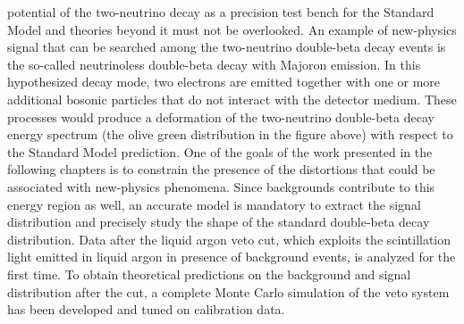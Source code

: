 potential of the two-neutrino decay as a precision test bench for the Standard Model and
theories beyond it must not be overlooked. An example of new-physics signal that
can be searched among the two-neutrino double-beta decay events is the so-called
neutrinoless double-beta decay with Majoron emission. In this hypothesized decay mode, two
electrons are emitted together with one or more additional bosonic particles that do not
interact with the detector medium. These processes would produce a deformation of the
two-neutrino double-beta decay energy spectrum (the olive green distribution in the figure
above) with respect to the Standard Model prediction.  One of the goals of the work
presented in the following chapters is to constrain the presence of the distortions that
could be associated with new-physics phenomena. Since backgrounds contribute to this
energy region as well, an accurate model is mandatory to extract the signal distribution
and precisely study the shape of the standard double-beta decay distribution. Data after
the liquid argon veto cut, which exploits the scintillation light emitted in liquid argon
in presence of background events, is analyzed for the first time.  To obtain theoretical
predictions on the background and signal distribution after the cut, a complete Monte
Carlo simulation of the veto system has been developed and tuned on calibration data.

